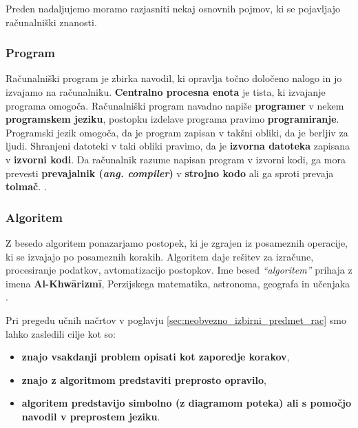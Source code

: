 Preden nadaljujemo moramo razjasniti nekaj osnovnih pojmov, ki se
pojavljajo računalniški znanosti.

\subsubsection{Program}
\label{sec:program}

Računalniški program je zbirka navodil, ki opravlja točno določeno
nalogo in jo izvajamo na računalniku. \textbf{Centralno procesna
  enota} je tista, ki izvajanje programa omogoča. Računalniški program
navadno napiše \textbf{programer} v nekem \textbf{programskem jeziku},
postopku izdelave programa pravimo \textbf{programiranje}. Programski
jezik omogoča, da je program zapisan v takšni obliki, da je berljiv za
ljudi. Shranjeni datoteki v taki obliki pravimo, da je \textbf{izvorna
  datoteka} zapisana v \textbf{izvorni kodi}. Da računalnik razume
napisan program v izvorni kodi, ga mora prevesti \textbf{prevajalnik
  (\emph{ang. compiler})} v \textbf{strojno kodo} ali ga sproti prevaja
\textbf{tolmač}.  \cite{wiki:computer_program}.

\subsubsection{Algoritem}
\label{sec:algoritem}

Z besedo algoritem ponazarjamo postopek, ki je zgrajen iz posameznih
operacije, ki se izvajajo po posameznih korakih. Algoritem daje rešitev
za izračune, procesiranje podatkov, avtomatizacijo postopkov.
Ime besed \emph{``algoritem''} prihaja z imena \textbf{Al-Khwārizmī},
Perzijskega matematika, astronoma, geografa in učenjaka \cite{wiki:algorithem}.

Pri pregedu učnih načrtov v poglavju
\ref{sec:neobvezno_izbirni_predmet_rac} smo lahko zasledili cilje kot
so:

\begin{itemize}
\tightlist
\item \textbf{znajo vsakdanji problem opisati kot zaporedje korakov},
\item \textbf{znajo z algoritmom predstaviti preprosto opravilo},
\item \textbf{algoritem predstavijo simbolno (z diagramom poteka) ali s
  pomočjo navodil v preprostem jeziku}.
\end{itemize}


